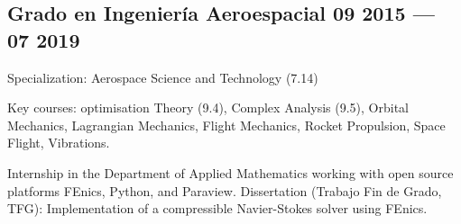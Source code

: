 \subsection{{Grado en Ingeniería Aeroespacial} \hfill	09 2015 --- 07 2019}  
\begin{zitemize}
\item Specialization: Aerospace Science and Technology (7.14)
\item Key courses: optimisation Theory (9.4), Complex Analysis (9.5), Orbital Mechanics, Lagrangian Mechanics, Flight
Mechanics, Rocket Propulsion, Space Flight, Vibrations.

\item Internship in the Department of Applied Mathematics working with open source platforms FEnics, Python, and
Paraview. Dissertation (Trabajo Fin de Grado, TFG): Implementation of a compressible Navier-Stokes solver using FEnics. 

\end{zitemize}
